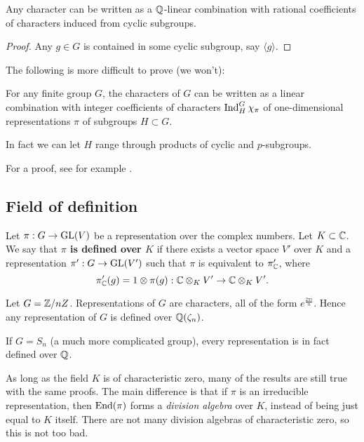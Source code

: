 \documentclass[11pt, english]{article}
\begin{document}
\begin{corr}
Any character can be written as a $\mathbb{Q}$-linear combination with rational coefficients of characters induced from cyclic subgroups.
\end{corr}
\begin{proof}
 Any $g \in G$ is contained in some cyclic subgroup, say $\langle g \rangle$. 
\end{proof}

The following is more difficult to prove (we won't):

\begin{thm}[Brauer]
\label{thmbrauer}
For any finite group $G$, the characters of $G$ can be written as a linear combination with integer coefficients of characters $\operatorname{Ind}_H^G \chi_\pi$ of one-dimensional representations $\pi$ of subgroups $H \subset G$.

In fact we can let $H$ range through products of cyclic and $p$-subgroups.
\end{thm}

For a proof, see for example \cite{serre_linrep}. 

\subsection{Field of definition}

Let $\pi:G \to \operatorname{GL}(V)$ be a representation over the complex numbers. Let $K \subset \mathbb{C}$. We say that \textbf{ $\pi$ is defined over $K$} if there exists a vector space $V'$ over $K$ and a representation $\pi' : G \to \operatorname{GL}(V')$ such that $\pi$ is equivalent to $\pi_{\mathbb{C}}'$, where
$$
\pi_{\mathbb{C}}'(g) = 1 \otimes \pi(g) : \mathbb{C} \otimes_K V' \to \mathbb{C} \otimes_K V'.
$$

\begin{example}
 Let $G = \mathbb{Z}/nZ$. Representations of $G$ are characters, all of the form $e^{\frac {2 \pi i}{n}}$. Hence any representation of $G$ is defined over $\mathbb{Q}(\zeta_n)$. 
\end{example}

\begin{example}
 If $G=S_n$ (a much more complicated group), every representation is in fact defined over $\mathbb{Q}$.
\end{example}

As long as the field $K$ is of characteristic zero, many of the results are still true with the same proofs. The main difference is that if $\pi$ is an irreducible representation, then $\operatorname{End}(\pi)$ forms a \emph{division algebra} over $K$, instead of being just equal to $K$ itself. There are not many division algebras of characteristic zero, so this is not too bad.
\end{document}
